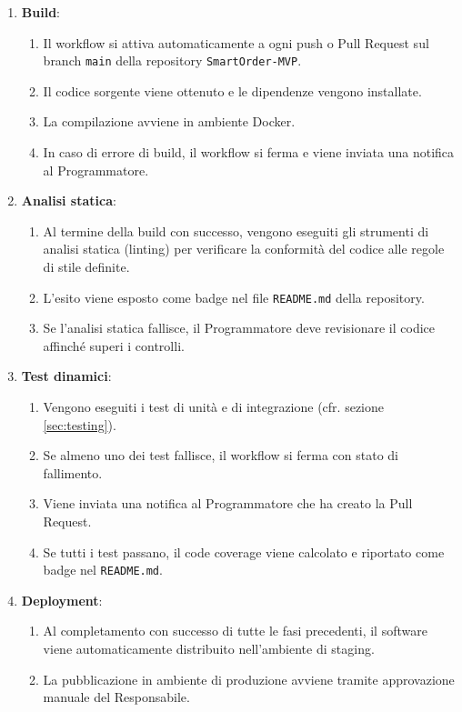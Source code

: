 \documentclass[a4paper, 11pt, oneside]{scrartcl}
\begin{document}
\begin{enumerate}
    \item \textbf{Build}:
    \begin{enumerate}[label=\alph*.]
        \item Il workflow si attiva automaticamente a ogni push o Pull Request sul branch \texttt{main} della repository \texttt{SmartOrder-MVP}.
        \item Il codice sorgente viene ottenuto e le dipendenze vengono installate.
        \item La compilazione avviene in ambiente Docker{\scriptsize{}}.
        \item In caso di errore di build, il workflow si ferma e viene inviata una notifica al Programmatore.
    \end{enumerate}
    \item \textbf{Analisi statica}:
    \begin{enumerate}[label=\alph*.]
        \item Al termine della build con successo, vengono eseguiti gli strumenti di analisi statica (linting) per verificare la conformità del codice alle regole di stile definite.
        \item L'esito viene esposto come badge nel file \texttt{README.md} della repository.
        \item Se l'analisi statica fallisce, il Programmatore deve revisionare il codice affinché superi i controlli.
    \end{enumerate}
    \item \textbf{Test dinamici}:
    \begin{enumerate}[label=\alph*.]
        \item Vengono eseguiti i test di unità e di integrazione (cfr. sezione \ref{sec:testing}).
        \item Se almeno uno dei test fallisce, il workflow si ferma con stato di fallimento.
        \item Viene inviata una notifica al Programmatore che ha creato la Pull Request.
        \item Se tutti i test passano, il code coverage viene calcolato e riportato come badge nel \texttt{README.md}.
    \end{enumerate}
    \item \textbf{Deployment}:
    \begin{enumerate}[label=\alph*.]
        \item Al completamento con successo di tutte le fasi precedenti, il software viene automaticamente distribuito nell'ambiente di staging.
        \item La pubblicazione in ambiente di produzione avviene tramite approvazione manuale del Responsabile.
    \end{enumerate}
\end{enumerate}
\end{document}
